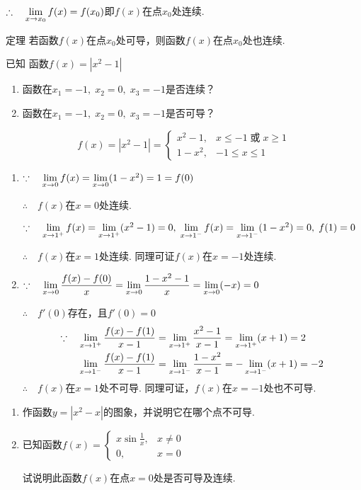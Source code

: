 $\therefore\quad \lim\limits_{x\to x_0}f(x)=f(x_0)$即$f(x)$在点$x_0$处连续.

\begin{thm}{定理}
    若函数$f(x)$在点$x_0$处可导，则函数$f(x)$在点$x_0$处也连续.
\end{thm}

\begin{example}
    已知 函数$f(x)=|x^2-1|$
\begin{enumerate}[(1)]
\item 函数在$x_1=-1,\; x_2=0,\; x_3=-1$是否连续？
\item 函数在$x_1=-1,\; x_2=0,\; x_3=-1$是否可导？
\end{enumerate}
\end{example}

\begin{solution}
\[f(x)=|x^2-1|=\begin{cases}
    x^2-1,& x\le -1\; \text{或}\; x\ge 1\\
    1-x^2,& -1\le x\le 1
\end{cases}\]
\begin{enumerate}[(1)]
    \item $\because\quad \lim\limits_{x\to 0}f(x)=\lim\limits_{x\to 0}(1-x^2)=1=f(0)$

    $\therefore\quad f(x)$在$x=0$处连续.

$\because\quad \lim\limits_{x\to 1^+}f(x)=\lim\limits_{x\to 1^+}(x^2-1)=0,\;  \lim\limits_{x\to 1^-}f(x)=\lim\limits_{x\to 1^-}(1-x^2)=0,\; f(1)=0$

$\therefore\quad f(x)$在$x=1$处连续. 同理可证$f(x)$在$x=-1$处连续.

\item $\because\quad \lim\limits_{x\to 0}\dfrac{f(x)-f(0)}{x}=\lim\limits_{x\to 0}\dfrac{1-x^2-1}{x}=\lim\limits_{x\to 0}(-x)=0$

$\therefore\quad f'(0)$存在，且$f'(0)=0$
\[\begin{split}
  \because\quad  \lim\limits_{x\to 1^+}\dfrac{f(x)-f(1)}{x-1}&= \lim\limits_{x\to 1^+}\dfrac{x^2-1}{x-1}= \lim\limits_{x\to 1^+}(x+1)=2\\
  \lim\limits_{x\to 1^-}\dfrac{f(x)-f(1)}{x-1}&=\lim\limits_{x\to 1^-}\dfrac{1-x^2}{x-1}=-\lim\limits_{x\to 1^-}(x+1)=-2
\end{split}\]
$\therefore\quad f(x)$在$x=1$处不可导. 同理可证，$f(x)$在$x=-1$处也不可导.
\end{enumerate}
\end{solution}

\begin{ex}
\begin{enumerate}
    \item 作函数$y=|x^2-x|$的图象，并说明它在哪个点不可导.
    \item 已知函数$f(x)=\begin{cases}
        x\sin\frac{1}{x},& x\ne 0\\
        0,& x=0
    \end{cases}$

    试说明此函数$f(x)$在点$x=0$处是否可导及连续.
\end{enumerate}
\end{ex}

